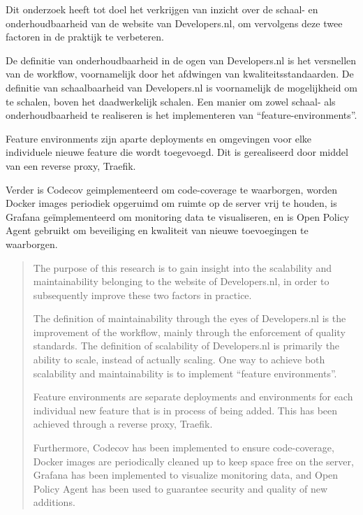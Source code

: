 \documentclass[
11pt, %
oneside, %
english, %
singlespacing, %
parskip, %
headsepline, %
]{formatting} %
\begin{document}

\begin{samenvatting}
Dit onderzoek heeft tot doel het verkrijgen van inzicht over de schaal- en onderhoudbaarheid van de website van Developers.nl, om vervolgens deze twee factoren in de praktijk te verbeteren.

De definitie van onderhoudbaarheid in de ogen van Developers.nl is het versnellen van de workflow, voornamelijk door het afdwingen van kwaliteitsstandaarden. De definitie van schaalbaarheid van Developers.nl is voornamelijk de mogelijkheid om te schalen, boven het daadwerkelijk schalen. Een manier om zowel schaal- als onderhoudbaarheid te realiseren is het implementeren van \enquote{feature-environments}. 

Feature environments zijn aparte deployments en omgevingen voor elke individuele nieuwe feature die wordt toegevoegd. Dit is gerealiseerd door middel van een reverse proxy, Traefik.

Verder is Codecov geimplementeerd om code-coverage te waarborgen, worden Docker images periodiek opgeruimd om ruimte op de server vrij te houden, is Grafana geïmplementeerd om monitoring data te visualiseren, en is Open Policy Agent gebruikt om beveiliging en kwaliteit van nieuwe toevoegingen te waarborgen.
\end{samenvatting}


\begin{abstract}
The purpose of this research is to gain insight into the scalability and maintainability belonging to the website of Developers.nl, in order to subsequently improve these two factors in practice.

The definition of maintainability through the eyes of Developers.nl is the improvement of the workflow, mainly through the enforcement of quality standards. The definition of scalability of Developers.nl is primarily the ability to scale, instead of actually scaling. One way to achieve both scalability and maintainability is to implement \enquote{feature environments}.

Feature environments are separate deployments and environments for each individual new feature that is in process of being added. This has been achieved through a reverse proxy, Traefik.

Furthermore, Codecov has been implemented to ensure code-coverage, Docker images are periodically cleaned up to keep space free on the server, Grafana has been implemented to visualize monitoring data, and Open Policy Agent has been used to guarantee security and quality of new additions.
\end{abstract}
\end{document}
